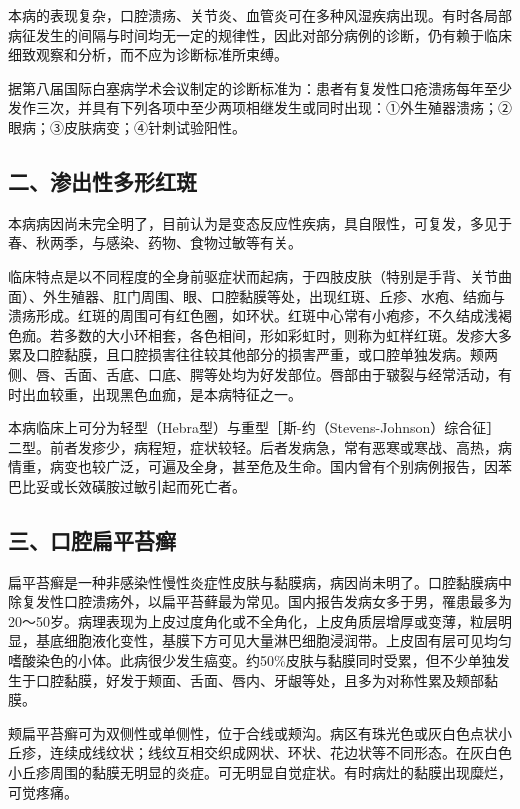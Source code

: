 本病的表现复杂，口腔溃疡、关节炎、血管炎可在多种风湿疾病出现。有时各局部病征发生的间隔与时间均无一定的规律性，因此对部分病例的诊断，仍有赖于临床细致观察和分析，而不应为诊断标准所束缚。

据第八届国际白塞病学术会议制定的诊断标准为：患者有复发性口疮溃疡每年至少发作三次，并具有下列各项中至少两项相继发生或同时出现：①外生殖器溃疡；②眼病；③皮肤病变；④针刺试验阳性。

\subsection{二、渗出性多形红斑}

本病病因尚未完全明了，目前认为是变态反应性疾病，具自限性，可复发，多见于春、秋两季，与感染、药物、食物过敏等有关。

临床特点是以不同程度的全身前驱症状而起病，于四肢皮肤（特别是手背、关节曲面）、外生殖器、肛门周围、眼、口腔黏膜等处，出现红斑、丘疹、水疱、结痂与溃疡形成。红斑的周围可有红色圈，如环状。红斑中心常有小疱疹，不久结成浅褐色痂。若多数的大小环相套，各色相间，形如彩虹时，则称为虹样红斑。发疹大多累及口腔黏膜，且口腔损害往往较其他部分的损害严重，或口腔单独发病。颊两侧、唇、舌面、舌底、口底、腭等处均为好发部位。唇部由于皲裂与经常活动，有时出血较重，出现黑色血痂，是本病特征之一。

本病临床上可分为轻型（Hebra型）与重型［斯-约（Stevens-Johnson）综合征］二型。前者发疹少，病程短，症状较轻。后者发病急，常有恶寒或寒战、高热，病情重，病变也较广泛，可遍及全身，甚至危及生命。国内曾有个别病例报告，因苯巴比妥或长效磺胺过敏引起而死亡者。

\subsection{三、口腔扁平苔癣}

扁平苔癣是一种非感染性慢性炎症性皮肤与黏膜病，病因尚未明了。口腔黏膜病中除复发性口腔溃疡外，以扁平苔藓最为常见。国内报告发病女多于男，罹患最多为20～50岁。病理表现为上皮过度角化或不全角化，上皮角质层增厚或变薄，粒层明显，基底细胞液化变性，基膜下方可见大量淋巴细胞浸润带。上皮固有层可见均匀嗜酸染色的小体。此病很少发生癌变。约50\%皮肤与黏膜同时受累，但不少单独发生于口腔黏膜，好发于颊面、舌面、唇内、牙龈等处，且多为对称性累及颊部黏膜。

颊扁平苔癣可为双侧性或单侧性，位于合线或颊沟。病区有珠光色或灰白色点状小丘疹，连续成线纹状；线纹互相交织成网状、环状、花边状等不同形态。在灰白色小丘疹周围的黏膜无明显的炎症。可无明显自觉症状。有时病灶的黏膜出现糜烂，可觉疼痛。


